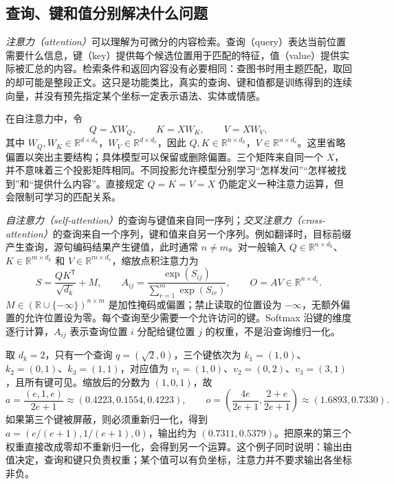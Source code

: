 \documentclass[UTF8,12pt,a4paper,fontset=fandol]{ctexart}
\begin{document}
\subsection{查询、键和值分别解决什么问题}

\emph{注意力（attention）}可以理解为可微分的内容检索。查询（query）表达当前位置需要什么信息，键（key）提供每个候选位置用于匹配的特征，值（value）提供实际被汇总的内容。检索条件和返回内容没有必要相同：查图书时用主题匹配，取回的却可能是整段正文。这只是功能类比，真实的查询、键和值都是训练得到的连续向量，并没有预先指定某个坐标一定表示语法、实体或情感。

在自注意力中，令
\begin{equation}
Q=XW_Q,\qquad K=XW_K,\qquad V=XW_V,
\label{eq:tr-qkv}
\end{equation}
其中 $W_Q,W_K\in\mathbb R^{d\times d_k}$，$W_V\in\mathbb R^{d\times d_v}$，因此 $Q,K\in\mathbb R^{n\times d_k}$，$V\in\mathbb R^{n\times d_v}$。这里省略偏置以突出主要结构；具体模型可以保留或删除偏置。三个矩阵来自同一个 $X$，并不意味着三个投影矩阵相同。不同投影允许模型分别学习“怎样发问”“怎样被找到”和“提供什么内容”。直接规定 $Q=K=V=X$ 仍能定义一种注意力运算，但会限制可学习的匹配关系。

\emph{自注意力（self-attention）}的查询与键值来自同一序列；\emph{交叉注意力（cross-attention）}的查询来自一个序列，键和值来自另一个序列。例如翻译时，目标前缀产生查询，源句编码结果产生键值，此时通常 $n\ne m$。对一般输入 $Q\in\mathbb R^{n\times d_k}$、$K\in\mathbb R^{m\times d_k}$ 和 $V\in\mathbb R^{m\times d_v}$，缩放点积注意力为
\begin{equation}
S=\frac{QK^{\mathsf T}}{\sqrt{d_k}}+M,\qquad
A_{ij}=\frac{\exp(S_{ij})}{\sum_{r=1}^{m}\exp(S_{ir})},\qquad
O=AV\in\mathbb R^{n\times d_v}.
\label{eq:tr-attention}
\end{equation}
$M\in(\mathbb R\cup\{-\infty\})^{n\times m}$ 是加性掩码或偏置；禁止读取的位置设为 $-\infty$，无额外偏置的允许位置设为零。每个查询至少需要一个允许访问的键。Softmax 沿键的维度逐行计算，$A_{ij}$ 表示查询位置 $i$ 分配给键位置 $j$ 的权重，不是沿查询维归一化。

\begin{example}[一次完整的注意力计算]
取 $d_k=2$，只有一个查询 $q=(\sqrt2,0)$，三个键依次为 $k_1=(1,0)$、$k_2=(0,1)$、$k_3=(1,1)$，对应值为 $v_1=(1,0)$、$v_2=(0,2)$、$v_3=(3,1)$，且所有键可见。缩放后的分数为 $(1,0,1)$，故
\[
a=\frac{(e,1,e)}{2e+1}\approx(0.4223,0.1554,0.4223),
\qquad
o=\left(\frac{4e}{2e+1},\frac{2+e}{2e+1}\right)
\approx(1.6893,0.7330).
\]
如果第三个键被屏蔽，则必须重新归一化，得到 $a=(e/(e+1),1/(e+1),0)$，输出约为 $(0.7311,0.5379)$。把原来的第三个权重直接改成零却不重新归一化，会得到另一个运算。这个例子同时说明：输出由值决定，查询和键只负责权重；某个值可以有负坐标，注意力并不要求输出各坐标非负。
\end{example}
\end{document}
